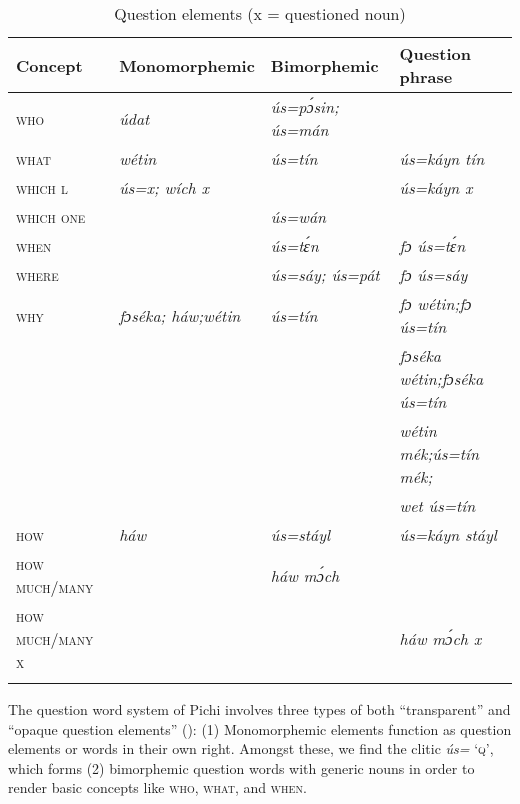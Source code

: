 \begin{table}
\caption{Question elements (x = questioned noun)}
\label{tab:key:7.4}

\begin{tabularx}{\textwidth}{lXXX}
\lsptoprule

Concept & Monomorphemic & Bimorphemic & Question phrase\\
\midrule
\textsc{who} & \itshape údat & \itshape ús=pɔ́sin; ús=mán & \\
\textsc{what} & \itshape wétin & \itshape ús=tín & \itshape ús=káyn tín \\
\textsc{which} \textsc{l} & \itshape ús=x; wích x &  & \itshape ús=káyn x\\
\textsc{which} \textsc{one} &  & \itshape ús=wán & \\
\textsc{when} &  & \itshape ús=tɛ́n & \itshape fɔ ús=tɛ́n\\
\textsc{where} &  & \itshape ús=sáy; ús=pát & \itshape fɔ ús=sáy\\
\textsc{why} & \itshape fɔséka; háw;\newline wétin & \itshape ús=tín & \itshape fɔ wétin;\newline fɔ ús=tín \\
&  &  & \itshape fɔséka wétin;\newline fɔséka ús=tín \\
&  &  & \itshape wétin mék;\newline ús=tín mék; \\
&  &  & \itshape wet ús=tín \\
\textsc{how} & \itshape háw & \itshape ús=stáyl & \itshape ús=káyn stáyl \\
\textsc{how} \textsc{much/many} &  & \itshape háw mɔ́ch & \\
\textsc{how} \textsc{much/many} \textsc{x} &  &  & \itshape háw mɔ́ch x\\
\lspbottomrule
\end{tabularx}
\end{table}

The question word system of Pichi involves three types of both “transparent” and “opaque question elements” (\citealt{MuyskenSmith1990}): (1) Monomorphemic elements function as question elements or words in their own right. Amongst these, we find the clitic \textit{ús=} ‘\textsc{q}’, which forms (2) bimorphemic question words with generic nouns in order to render basic concepts like \textsc{who,} \textsc{what,} and \textsc{when.}

